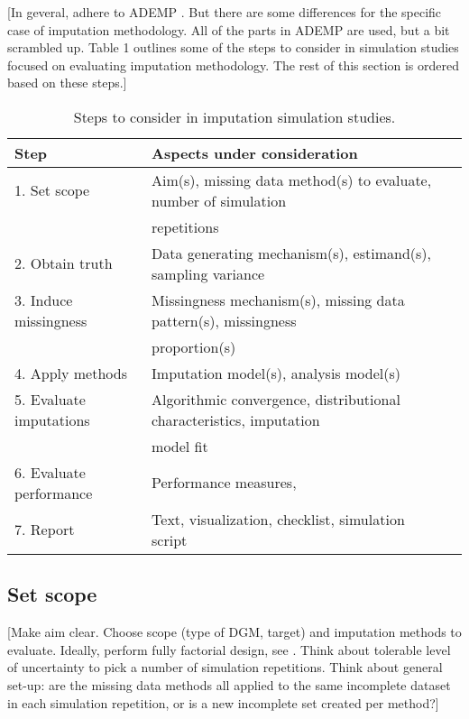 \documentclass[bimj,fleqn]{w-art}
\theoremstyle{plain}
\theoremstyle{definition}
\begin{document}
[In geveral, adhere to ADEMP \citep{morr18}. But there are some differences for the specific case of imputation methodology. All of the parts in ADEMP are used, but a bit scrambled up. Table 1 outlines some of the steps to consider in simulation studies focused on evaluating imputation methodology. The rest of this section is ordered based on these steps.]

\begin{table}[htb]
\begin{center}
\caption{Steps to consider in imputation simulation studies.}
\begin{tabular}{lll}
\hline
Step                    & Aspects under consideration \\
\hline  
1. Set scope            & Aim(s), missing data method(s) to evaluate, number of simulation \\
                        & repetitions \\
2. Obtain truth         & Data generating mechanism(s), estimand(s), sampling variance \\
3. Induce missingness   & Missingness mechanism(s), missing data pattern(s), missingness \\
                        & proportion(s) \\
4. Apply methods        & Imputation model(s), analysis model(s) \\
5. Evaluate imputations & Algorithmic convergence, distributional characteristics, imputation \\
                        & model fit \\
6. Evaluate performance & Performance measures,  \\
7. Report               & Text, visualization, checklist, simulation script \\
\hline
\end{tabular}
\end{center}
\end{table}



\subsection{Set scope}

[Make aim clear. Choose scope (type of DGM, target) and imputation methods to evaluate. Ideally, perform fully factorial design, see \citet{morr18}. Think about tolerable level of uncertainty to pick a number of simulation repetitions. Think about general set-up: are the missing data methods all applied to the same incomplete dataset in each simulation repetition, or is a new incomplete set created per method?] 
\end{document}
